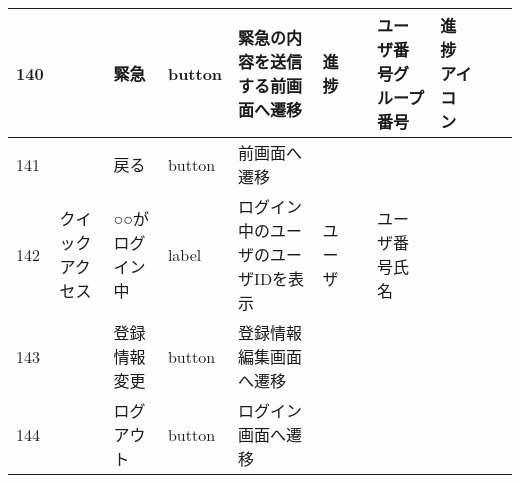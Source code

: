 \begin{table}[]
\begin{tabular}{|l|l|l|l|l|l|l|l|l|l|l|}
140 &               & 緊急               & button   & 緊急の内容を送信する前画面へ遷移                                                  & 進捗      &                       & ユーザ番号グループ番号        & 進捗アイコン          &                               &                                                                \\ \hline
141 &               & 戻る               & button   & 前画面へ遷移                                                            &         &                       &                    &                 &                               &                                                                \\ \hline
142 & クイックアクセス      & ○○がログイン中         & label    & ログイン中のユーザのユーザIDを表示                                                & ユーザ     &                       & ユーザ番号氏名            &                 &                               &                                                                \\ \hline
143 &               & 登録情報変更           & button   & 登録情報編集画面へ遷移                                                       &         &                       &                    &                 &                               &                                                                \\ \hline
144 &               & ログアウト            & button   & ログイン画面へ遷移                                                         &         &                       &                    &                 &                               &                                                                \\ \hline
\end{tabular}
\end{table}
